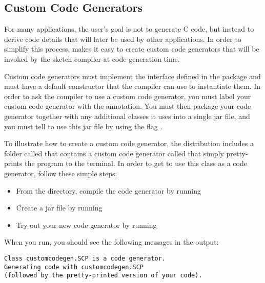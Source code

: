\subsection{Custom Code Generators}

For many applications, the user's goal is not to generate C code, but instead to derive code details that will later be used by other applications. In order to simplify this process, \Sk{} makes it easy to create custom code generators that will be invoked by the sketch compiler at code generation time. 

Custom code generators must implement the  interface defined in the  package and must have a default constructor that the compiler can use to instantiate them. In order to ask the compiler to use a custom code generator, you must label your custom code generator with the  annotation. You must then package your code generator together with any additional classes it uses into a single jar file, and you must tell \Sk{} to use this jar file by using the flag . 



To illustrate how to create a custom code generator, the \Sk{} distribution includes a folder called  that contains a custom code generator called  that simply pretty-prints the program to the terminal. In order to get \Sk{} to use this class as a code generator, follow these simple steps:

\begin{itemize}
\item From the  directory, compile the code generator by running \newline
 \version{}
\item Create a jar file by running \newline
{}
\item Try out your new code generator by running \newline
{}
\end{itemize}

When you run, you should see the following messages in the output:
\begin{lstlisting}
Class customcodegen.SCP is a code generator.
Generating code with customcodegen.SCP
(followed by the pretty-printed version of your code).
\end{lstlisting}




